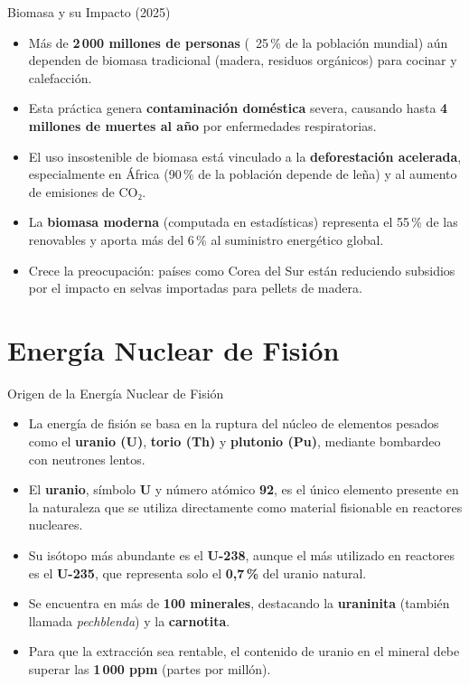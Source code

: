\documentclass[main.tex]{subfiles}
\begin{document}
\begin{frame}{Biomasa y su Impacto (2025)}
    \begin{itemize}
        \item Más de \textbf{2\,000 millones de personas} (~25\,\% de la población mundial) aún dependen de biomasa tradicional (madera, residuos orgánicos) para cocinar y calefacción.
        \item Esta práctica genera \textbf{contaminación doméstica} severa, causando hasta \textbf{4 millones de muertes al año} por enfermedades respiratorias.
        \item El uso insostenible de biomasa está vinculado a la \textbf{deforestación acelerada}, especialmente en África (90\,\% de la población depende de leña) y al aumento de emisiones de CO₂.
        \item La \textbf{biomasa moderna} (computada en estadísticas) representa el 55\,\% de las renovables y aporta más del 6\,\% al suministro energético global.
        \item Crece la preocupación: países como Corea del Sur están reduciendo subsidios por el impacto en selvas importadas para pellets de madera.
    \end{itemize}
\end{frame}




\section{Energía Nuclear de Fisión}
\begin{frame}{Origen de la Energía Nuclear de Fisión}
    \begin{itemize}
        \item La energía de fisión se basa en la ruptura del núcleo de elementos pesados como el \textbf{uranio (U)}, \textbf{torio (Th)} y \textbf{plutonio (Pu)}, mediante bombardeo con neutrones lentos.
        \item El \textbf{uranio}, símbolo \textbf{U} y número atómico \textbf{92}, es el único elemento presente en la naturaleza que se utiliza directamente como material fisionable en reactores nucleares.
        \item Su isótopo más abundante es el \textbf{U-238}, aunque el más utilizado en reactores es el \textbf{U-235}, que representa solo el \textbf{0{,}7\,\%} del uranio natural.
        \item Se encuentra en más de \textbf{100 minerales}, destacando la \textbf{uraninita} (también llamada \textit{pechblenda}) y la \textbf{carnotita}.
        \item Para que la extracción sea rentable, el contenido de uranio en el mineral debe superar las \textbf{1\,000 ppm} (partes por millón).
    \end{itemize}
\end{frame}
\end{document}
